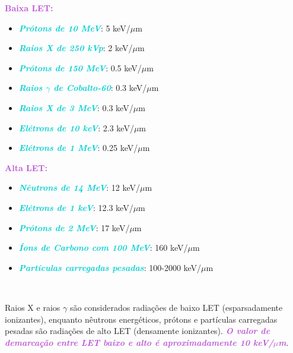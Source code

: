 \documentclass[11pt,a4paper]{article}
\begin{document}
	\begin{tcolorbox}[width=\textwidth, colback={white}, colbacktitle={DarkTurquoise!50!white}, title={$\bigstar$ \LobsterTwo{Valores Típicos da LET} $\bigstar$}, coltitle={CarnationPink}, colframe={DarkTurquoise}, fonttitle=\rmfamily\bfseries\Large, breakable]\label{exp:let}
	\textcolor{MediumOrchid}{\LobsterTwo\large\textbf{Baixa LET:}}
	\begin{itemize}
		\item \textcolor{DarkTurquoise}{\textbf{\textit{Prótons de 10 MeV}}}: 5 keV/$\mu$m
		\item \textcolor{DarkTurquoise}{\textbf{\textit{Raios X de 250 kVp}}}: 2 keV/$\mu$m		
		\item \textcolor{DarkTurquoise}{\textbf{\textit{Prótons de 150 MeV}}}: 0.5 keV/$\mu$m
		\item \textcolor{DarkTurquoise}{\textbf{\textit{Raios $\gamma$ de Cobalto-60}}}: 0.3 keV/$\mu$m
		\item \textcolor{DarkTurquoise}{\textbf{\textit{Raios X de 3 MeV}}}: 0.3 keV/$\mu$m
		\item \textcolor{DarkTurquoise}{\textbf{\textit{Elétrons de 10 keV}}}: 2.3 keV/$\mu$m
		\item \textcolor{DarkTurquoise}{\textbf{\textit{Elétrons de 1 MeV}}}: 0.25 keV/$\mu$m
	\end{itemize}

	\textcolor{MediumOrchid}{\LobsterTwo\large\textbf{Alta LET:}}
	\begin{itemize}
		\item \textcolor{DarkTurquoise}{\textbf{\textit{Nêutrons de 14 MeV}}}: 12 keV/$\mu$m
		\item \textcolor{DarkTurquoise}{\textbf{\textit{Elétrons de 1 keV}}}: 12.3 keV/$\mu$m
		\item \textcolor{DarkTurquoise}{\textbf{\textit{Prótons de 2 MeV}}}: 17 keV/$\mu$m
		\item \textcolor{DarkTurquoise}{\textbf{\textit{Íons de Carbono com 100 MeV}}}: 160 keV/$\mu$m
		\item \textcolor{DarkTurquoise}{\textbf{\textit{Partículas carregadas pesadas}}}: 100-2000 keV/$\mu$m
	\end{itemize}

	\end{tcolorbox}

	\
	
	Raios X e raios $\gamma$ são considerados radiações de baixo LET (esparsadamente ionizantes), enquanto nêutrons energéticos, prótons e partículas carregadas pesadas são radiações de alto LET (densamente ionizantes). \textcolor{MediumOrchid}{\textbf{\textit{O valor de demarcação entre LET baixo e alto é aproximadamente 10 keV/$\mu$m}}}.
\end{document}
